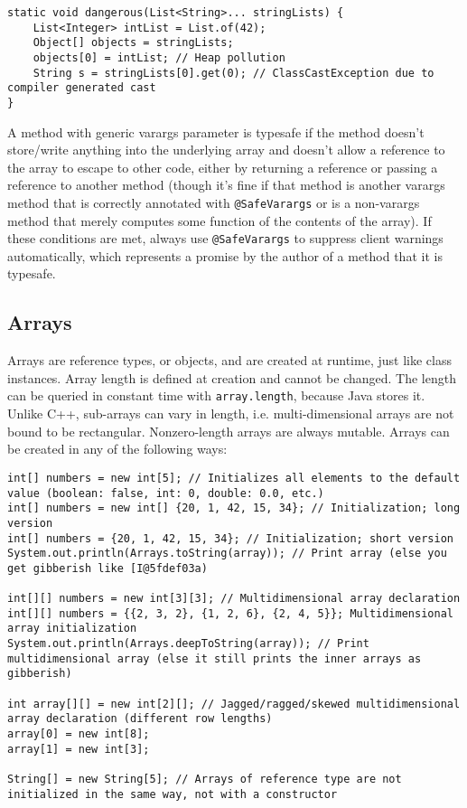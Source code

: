 \documentclass[8pt, table, xcdraw]{article}%
\begin{document}
\begin{lstlisting}
static void dangerous(List<String>... stringLists) {
    List<Integer> intList = List.of(42);
    Object[] objects = stringLists;
    objects[0] = intList; // Heap pollution
    String s = stringLists[0].get(0); // ClassCastException due to compiler generated cast
}
\end{lstlisting}

A method with generic varargs parameter is typesafe if the method doesn't store/write anything into the underlying array and doesn't allow a reference to the array to escape to other code, either by returning a reference or passing a reference to another method (though it's fine if that method is another varargs method that is correctly annotated with \lstinline{@SafeVarargs} or is a non-varargs method that merely computes some function of the contents of the array). If these conditions are met, always use \lstinline{@SafeVarargs} to suppress client warnings automatically, which represents a promise by the author of a method that it is typesafe.

\subsection{Arrays}

Arrays are reference types, or objects, and are created at runtime, just like class instances. Array length is defined at creation and cannot be changed. The length can be queried in constant time with \lstinline{array.length}, because Java stores it. Unlike C++, sub-arrays can vary in length, i.e. multi-dimensional arrays are not bound to be rectangular. Nonzero-length arrays are always mutable. Arrays can be created in any of the following ways:

\begin{lstlisting}
int[] numbers = new int[5]; // Initializes all elements to the default value (boolean: false, int: 0, double: 0.0, etc.)
int[] numbers = new int[] {20, 1, 42, 15, 34}; // Initialization; long version
int[] numbers = {20, 1, 42, 15, 34}; // Initialization; short version
System.out.println(Arrays.toString(array)); // Print array (else you get gibberish like [I@5fdef03a)

int[][] numbers = new int[3][3]; // Multidimensional array declaration
int[][] numbers = {{2, 3, 2}, {1, 2, 6}, {2, 4, 5}}; Multidimensional array initialization
System.out.println(Arrays.deepToString(array)); // Print multidimensional array (else it still prints the inner arrays as gibberish)

int array[][] = new int[2][]; // Jagged/ragged/skewed multidimensional array declaration (different row lengths)
array[0] = new int[8];
array[1] = new int[3];

String[] = new String[5]; // Arrays of reference type are not initialized in the same way, not with a constructor
\end{lstlisting}
\end{document}
